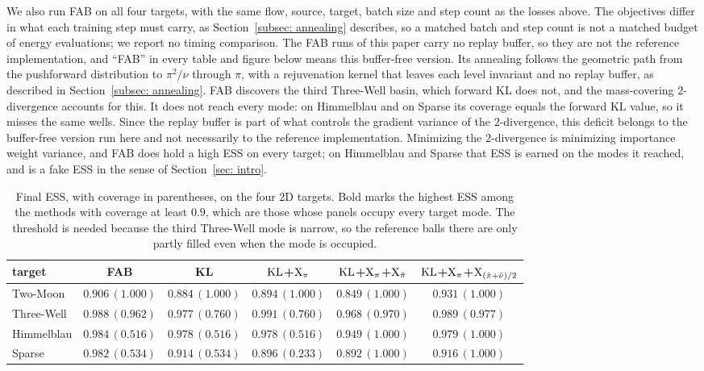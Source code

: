 \documentclass{article}
\begin{document}
We also run FAB \citep{midgley2022flow} on all four targets, with the same flow, source, target, batch size and step count as the losses above. The objectives differ in what each training step must carry, as Section~\ref{subsec: annealing} describes, so a matched batch and step count is not a matched budget of energy evaluations; we report no timing comparison. The FAB runs of this paper carry no replay buffer, so they are not the reference implementation, and ``FAB'' in every table and figure below means this buffer-free version. Its annealing follows the geometric path from the pushforward distribution to $\pi^2/\nu$ through $\pi$, with a rejuvenation kernel that leaves each level invariant and no replay buffer, as described in Section~\ref{subsec: annealing}. FAB discovers the third Three-Well basin, which forward KL does not, and the mass-covering $2$-divergence accounts for this. It does not reach every mode: on Himmelblau and on Sparse its coverage equals the forward KL value, so it misses the same wells. Since the replay buffer is part of what controls the gradient variance of the $2$-divergence, this deficit belongs to the buffer-free version run here and not necessarily to the reference implementation. Minimizing the $2$-divergence is minimizing importance weight variance, and FAB does hold a high ESS on every target; on Himmelblau and Sparse that ESS is earned on the modes it reached, and is a fake ESS in the sense of Section~\ref{sec: intro}. 

\begin{table}[htb]
    \centering
    \begin{tabular}{lccccc}
        \toprule
        target & FAB & KL & $\mathrm{KL}$+$\mathrm{X}_\pi$ & $\mathrm{KL}$+$\mathrm{X}_\pi$+$\mathrm{X}_{\hat\pi}$ & $\mathrm{KL}$+$\mathrm{X}_\pi$+$\mathrm{X}_{(\hat\pi+\bar\nu)/2}$ \\
        \midrule
        Two-Moon   & $0.906\,(1.000)$ & $0.884\,(1.000)$ & $0.894\,(1.000)$ & $0.849\,(1.000)$ & $\mathbf{0.931}\,(1.000)$ \\
        Three-Well & $0.988\,(0.962)$ & $0.977\,(0.760)$ & $0.991\,(0.760)$ & $0.968\,(0.970)$ & $\mathbf{0.989}\,(0.977)$ \\
        Himmelblau & $0.984\,(0.516)$ & $0.978\,(0.516)$ & $0.978\,(0.516)$ & $0.949\,(1.000)$ & $\mathbf{0.979}\,(1.000)$ \\
        Sparse     & $0.982\,(0.534)$ & $0.914\,(0.534)$ & $0.896\,(0.233)$ & $0.892\,(1.000)$ & $\mathbf{0.916}\,(1.000)$ \\
        \bottomrule
    \end{tabular}
    \caption{Final ESS, with coverage in parentheses, on the four 2D targets. Bold marks the highest ESS among the methods with coverage at least $0.9$, which are those whose panels occupy every target mode. The threshold is needed because the third Three-Well mode is narrow, so the reference balls there are only partly filled even when the mode is occupied.}
    \label{tab: 2d-benchmark-summary}
\end{table}
\end{document}
